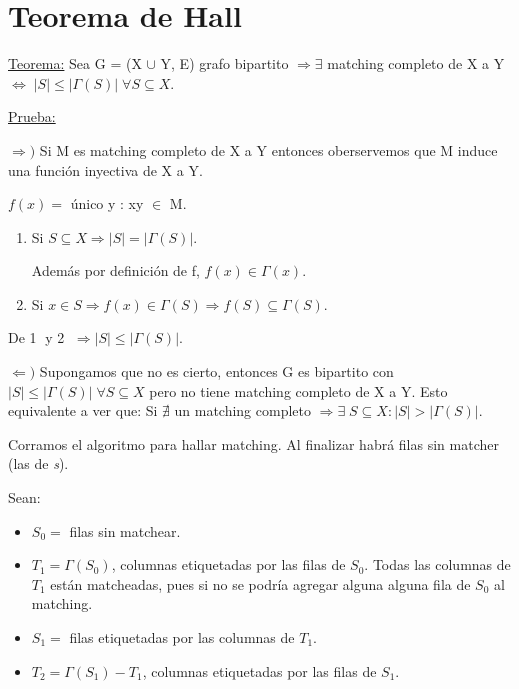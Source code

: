 \documentclass[12pt,a4paper]{report}
\begin{document}
	\section{Teorema de Hall}
	
		\underline{Teorema:} Sea G = (X $\cup$ Y, E) grafo bipartito $\Rightarrow \exists$ matching completo de X a Y $\Leftrightarrow \; \lvert S \rvert \leq \lvert \Gamma(S) \rvert \; \forall S \subseteq X$.
		
		\vspace{3mm}
		\underline{Prueba:}

			$\Rightarrow)$ Si M es matching completo de X a Y entonces oberservemos que M induce una función inyectiva de X a Y.
			
			\begin{center}
				$f(x) = $ único y : xy $\in$ M.
			\end{center}
			
			\begin{enumerate}
				\item Si $S \subseteq X \Rightarrow \lvert S \rvert = \lvert \Gamma(S) \rvert$. 

				Además por definición de f, $f(x) \in \Gamma(x)$.
				\item Si $x \in S \Rightarrow f(x) \in \Gamma(S)
				\Rightarrow f(S) \subseteq \Gamma(S)$.
			\end{enumerate}
			
			De \textcircled{1} y \textcircled{2} $\Rightarrow \lvert S \rvert \leq \lvert \Gamma(S) \rvert$.
			
			\vspace{5mm}
			$\Leftarrow)$ Supongamos que no es cierto, entonces G es bipartito con $\lvert S \rvert \leq \lvert \Gamma(S) \rvert \; \forall S \subseteq X$ pero no tiene matching completo de X a Y. Esto equivalente a ver que: Si $\nexists$ un matching completo $\Rightarrow \exists \; S \subseteq X : \lvert S \rvert > \lvert \Gamma(S) \rvert$.
			
			\vspace{5 mm}
			Corramos el algoritmo para hallar matching. Al finalizar habrá filas sin matcher (las de \textit{s}).
			
			\vspace{5mm}
			Sean:
			\begin{itemize}
				\item $S_{0} =$ filas sin matchear.
				\item $T_{1} = \Gamma(S_{0})$, columnas etiquetadas por las filas de $S_{0}$. Todas las columnas de $T_{1}$ están matcheadas, pues si no se podría agregar alguna alguna fila de $S_{0}$ al matching.
				\item $S_{1} =$ filas etiquetadas por las columnas de $T_{1}$.
				\item $T_{2} = \Gamma(S_{1}) - T_{1}$, columnas etiquetadas por las filas de $S_{1}$. 
			\end{itemize}
	
\end{document}
